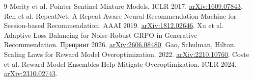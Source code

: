 \documentclass[10pt,a4paper,twocolumn]{article}
\begin{document}
\begin{thebibliography}{9}\small\setlength{\itemsep}{1pt}
 Merity et al. Pointer Sentinel Mixture Models. ICLR 2017.
\href{https://arxiv.org/abs/1609.07843}{arXiv:1609.07843}.
 Ren et al. RepeatNet: A Repeat Aware Neural Recommendation
Machine for Session-based Recommendation. AAAI 2019.
\href{https://arxiv.org/abs/1812.02646}{arXiv:1812.02646}.
 Xu et al. Adaptive Loss Balancing for Noise-Robust GRPO in
Generative Recommendation. Препринт 2026.
\href{https://arxiv.org/abs/2606.08480}{arXiv:2606.08480}.
 Gao, Schulman, Hilton. Scaling Laws for Reward Model
Overoptimization. 2022. \href{https://arxiv.org/abs/2210.10760}{arXiv:2210.10760}.
 Coste et al. Reward Model Ensembles Help Mitigate
Overoptimization. ICLR 2024. \href{https://arxiv.org/abs/2310.02743}{arXiv:2310.02743}.
\end{thebibliography}
\end{document}
